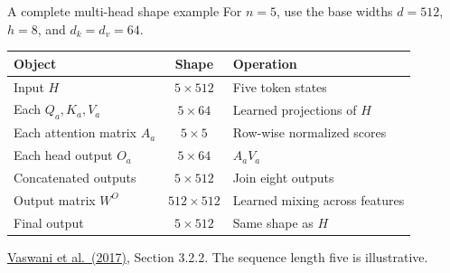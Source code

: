 \documentclass[aspectratio=169,11pt]{beamer}
\newcommand{\src}[1]{\par\vfill{\fontsize{7}{8.5}\selectfont\color{muted}#1}\par}
\newcommand{\paper}{\href{https://arxiv.org/abs/1706.03762}{Vaswani et al.\ (2017)}}
\begin{document}
\begin{frame}[t]{A complete multi-head shape example}
For $n=5$, use the base widths $d=512$, $h=8$, and $d_k=d_v=64$.
\small
\begin{tabularx}{\textwidth}{@{}lcX@{}}
\toprule
Object & Shape & Operation \\
\midrule
Input $H$ & $5\times512$ & Five token states \\
Each $Q_a,K_a,V_a$ & $5\times64$ & Learned projections of $H$ \\
Each attention matrix $A_a$ & $5\times5$ & Row-wise normalized scores \\
Each head output $O_a$ & $5\times64$ & $A_aV_a$ \\
Concatenated outputs & $5\times512$ & Join eight outputs \\
Output matrix $W^O$ & $512\times512$ & Learned mixing across features \\
Final output & $5\times512$ & Same shape as $H$ \\
\bottomrule
\end{tabularx}
\src{\paper, Section 3.2.2. The sequence length five is illustrative.}
\end{frame}
\end{document}
